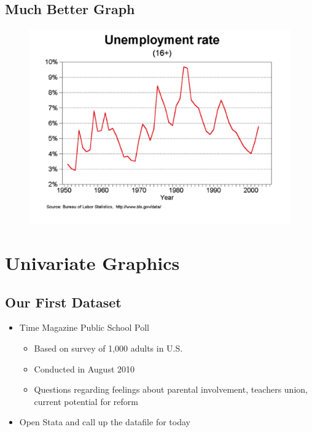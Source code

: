 \documentclass[]{book}
\providecommand{\tightlist}{%
  \setlength{\itemsep}{0pt}\setlength{\parskip}{0pt}}
\begin{document}
\subsection{Much Better Graph}\label{much-better-graph}

\begin{figure}
\centering
\includegraphics{Stata/StataModGraph/images/Good.png}
\caption{}
\end{figure}

\section{Univariate Graphics}\label{univariate-graphics}

\subsection{Our First Dataset}\label{our-first-dataset}

\begin{itemize}
\tightlist
\item
  Time Magazine Public School Poll

  \begin{itemize}
  \tightlist
  \item
    Based on survey of 1,000 adults in U.S.
  \item
    Conducted in August 2010
  \item
    Questions regarding feelings about parental involvement, teachers
    union, current potential for reform
  \end{itemize}
\item
  Open Stata and call up the datafile for today
\end{itemize}
\end{document}
